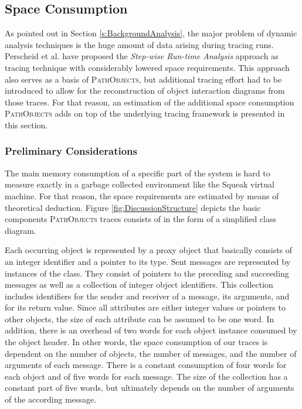 \subsection{Space Consumption}
\label{ss:DiscussionSpace}
As pointed out in Section \ref{s:BackgroundAnalysis}, the major problem of dynamic analysis techniques is the huge amount of data arising during tracing runs.
Perscheid et al. have proposed the \emph{Step-wise Run-time Analysis} approach \cite{perscheid_immediacy_2010} as tracing technique with considerably lowered space requirements. 
This approach also serves as a basis of \textsc{PathObjects}, but additional tracing effort had to be introduced to allow for the reconstruction of object interaction diagrams from those traces.
For that reason, an estimation of the additional space consumption \textsc{PathObjects} adds on top of the underlying tracing framework is presented in this section.

\subsubsection{Preliminary Considerations}
The main memory consumption of a specific part of the system is hard to measure exactly in a garbage collected environment like the Squeak virtual machine.
For that reason, the space requirements are estimated by means of theoretical deduction.
Figure \ref{fig:DiscussionStructure} depicts the basic components \textsc{PathObjects} traces consists of in the form of a simplified class diagram.

Each occurring object is represented by a proxy object that basically consists of an integer identifier and a pointer to its type.
Sent messages are represented by instances of the  class.
They consist of pointers to the preceding and succeeding messages as well as a collection of integer object identifiers.
This collection includes identifiers for the sender and receiver of a message, its arguments, and for its return value.
Since all attributes are either integer values or pointers to other objects, the size of each attribute can be assumed to be one word.
In addition, there is an overhead of two words for each object instance consumed by the object header.
In other words, the space consumption of our traces is dependent on the number of objects, the number of messages, and the number of arguments of each message.
There is a constant consumption of four words for each object and of five words for each message.
The size of the  collection has a constant part of five words, but ultimately depends on the number of arguments of the according message.

